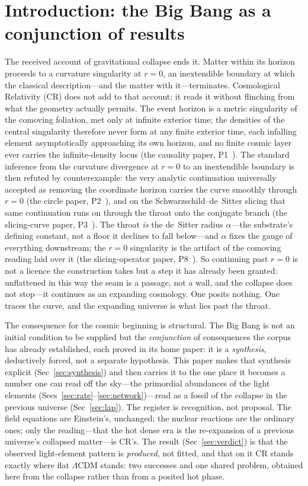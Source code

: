 \documentclass[11pt,a4paper]{article}
\theoremstyle{plain}
\theoremstyle{definition}
\theoremstyle{remark}
\begin{document}
\section{Introduction: the Big Bang as a conjunction of results}\label{sec:intro}
The received account of gravitational collapse ends it. Matter within its horizon proceeds
to a curvature singularity at $r=0$, an inextendible boundary at which the classical
description---and the matter with it---terminates. Cosmological Relativity (CR) does not add
to that account; it reads it without flinching from what the geometry actually permits. The
event horizon is a metric singularity of the comoving foliation, met only at infinite
exterior time; the densities of the central singularity therefore never form at any finite
exterior time, each infalling element asymptotically approaching its own horizon, and no
finite cosmic layer ever carries the infinite-density locus (the causality paper, P1~\cite{JanzenBHcausality}). The
standard inference from the curvature divergence at $r=0$ to an inextendible boundary is then
refuted by counterexample: the very analytic continuation universally accepted as removing the
coordinate horizon carries the curve smoothly through $r=0$ (the circle paper, P2~\cite{JanzenCircle}), and on the
Schwarzschild--de~Sitter slicing that same continuation runs on through the throat onto the
conjugate branch (the slicing-curve paper, P3~\cite{JanzenSlicing}). The throat \emph{is} the de~Sitter radius $\alpha$---the substrate's defining constant, not a floor it declines to fall below---and $\alpha$ fixes the gauge of everything downstream; the $r=0$ singularity is the artifact of the comoving reading laid
over it (the slicing-operator paper, P8~\cite{JanzenOperator}). So continuing past $r=0$ is not a licence the
construction takes but a step it has already been granted: unflattened in this way the seam is
a passage, not a wall, and the collapse does not stop---it continues as an expanding cosmology.
One posits nothing. One traces the curve, and the expanding universe is what lies past the throat.

The consequence for the cosmic beginning is structural. The Big Bang is not an initial
condition to be supplied but the \emph{conjunction} of consequences the corpus has already
established, each proved in its home paper: it is a \emph{synthesis}, deductively forced, not
a separate hypothesis. This paper makes that synthesis explicit (Sec~\ref{sec:synthesis}) and
then carries it to the one place it becomes a number one can read off the sky---the
primordial abundances of the light elements (Secs~\ref{sec:rate}--\ref{sec:network})---read
as a fossil of the collapse in the previous universe (Sec~\ref{sec:lap}). The register is
recognition, not proposal. The field equations are Einstein's, unchanged; the nuclear
reactions are the ordinary ones; only the reading---that the hot dense era is the
re-expansion of a previous universe's collapsed matter---is CR's. The result
(Sec~\ref{sec:verdict}) is that the observed light-element pattern is \emph{produced}, not
fitted, and that on it CR stands exactly where flat $\Lambda$CDM stands: two successes and one
shared problem, obtained here from the collapse rather than from a posited hot phase.
\end{document}
